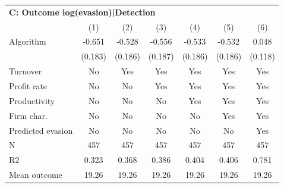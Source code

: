 \begin{tabular}{lcccccc}
\midrule \multicolumn{7}{l}{\textbf{C: Outcome log(evasion)|Detection}} \\ \multicolumn{1}{l}{} & (1) & (2) & (3) & (4) & (5) & (6) \\ \midrule
Algorithm   &      -0.651\sym{***}&      -0.528\sym{***}&      -0.556\sym{***}&      -0.533\sym{***}&      -0.532\sym{***}&       0.048         \\
            &     (0.183)         &     (0.186)         &     (0.187)         &     (0.186)         &     (0.186)         &     (0.118)         \\
\midrule
Turnover    &          No         &         Yes         &         Yes         &         Yes         &         Yes         &         Yes         \\
Profit rate &          No         &          No         &         Yes         &         Yes         &         Yes         &         Yes         \\
Productivity&          No         &          No         &          No         &         Yes         &         Yes         &         Yes         \\
Firm char.  &          No         &          No         &          No         &          No         &         Yes         &         Yes         \\
Predicted evasion&          No         &          No         &          No         &          No         &          No         &         Yes         \\
N           &         457         &         457         &         457         &         457         &         457         &         457         \\
R2          &       0.323         &       0.368         &       0.386         &       0.404         &       0.406         &       0.781         \\
Mean outcome&       19.26         &       19.26         &       19.26         &       19.26         &       19.26         &       19.26         \\
\bottomrule \end{tabular}
